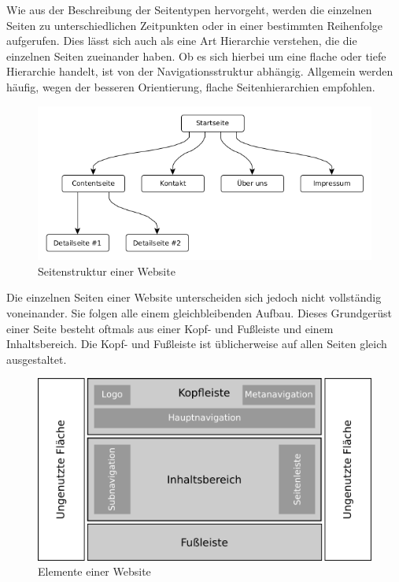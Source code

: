 Wie aus der Beschreibung der Seitentypen hervorgeht, werden die einzelnen Seiten zu unterschiedlichen Zeitpunkten oder in einer bestimmten Reihenfolge aufgerufen. Dies lässt sich auch als eine Art Hierarchie verstehen, die die einzelnen Seiten zueinander haben. Ob es sich hierbei um eine flache oder tiefe Hierarchie handelt, ist von der Navigationsstruktur abhängig. Allgemein werden häufig, wegen der besseren Orientierung, flache Seitenhierarchien empfohlen.

\begin{figure}
    \centering
    \includegraphics[width=\textwidth]{figures/jan/Wire_Hierarchie.png}
    \caption[Seitenstruktur einer Website]{Seitenstruktur einer Website}
    \label{fig:image}
\end{figure}

Die einzelnen Seiten einer Website unterscheiden sich jedoch \idR nicht vollständig voneinander. Sie folgen alle einem gleichbleibenden Aufbau. Dieses Grundgerüst einer Seite besteht oftmals aus einer Kopf- und Fußleiste und einem Inhaltsbereich. Die Kopf- und Fußleiste ist üblicherweise auf allen Seiten gleich ausgestaltet.

\begin{figure}
    \centering
    \includegraphics[]{figures/jan/Wire_Areas.png}
    \caption[Elemente einer Website]{Elemente einer Website}
    \label{fig:image}
\end{figure}

